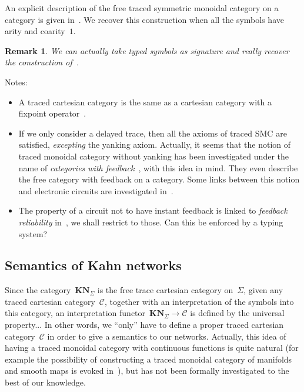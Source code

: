 \documentclass{article}
\newtheorem{remark}[theorem]{Remark}
\newcommand{\category}[1]{\mathbf{#1}}
\newcommand{\KN}{\category{KN}}
\renewcommand{\C}{\mathcal{C}}
\begin{document}
An explicit description of the free traced symmetric monoidal category on a
category is given in~\cite{abramsky:traced-compact-closed}. We recover this
construction when all the symbols have arity and coarity~$1$.

\begin{remark}
  We can actually take typed symbols as signature and really recover the
  construction of~\cite{abramsky:traced-compact-closed}.
\end{remark}

Notes:
\begin{itemize}
\item A traced cartesian category is the same as a cartesian category with a
  fixpoint operator~\cite{hasegawa1997recursion}.
\item If we only consider a delayed trace, then all the axioms of traced SMC are
  satisfied, \emph{excepting} the yanking axiom. Actually, it seems that the
  notion of traced monoidal category without yanking has been investigated under
  the name of \emph{categories with feedback}~\cite{katis2002feedback}, with
  this idea in mind. They even describe the free category with feedback on a
  category. Some links between this notion and electronic circuits are
  investigated in~\cite{katis1999algebra}.
\item The property of a circuit not to have instant feedback is linked to
  \emph{feedback reliability} in~\cite{pardo2004synchronous}, we shall restrict
  to those. Can this be enforced by a typing system?
\end{itemize}

\subsection{Semantics of Kahn networks}
Since the category~$\KN_\Sigma$ is the free trace cartesian category
on~$\Sigma$, given any traced cartesian category~$\C$, together with an
interpretation of the symbols into this category, an interpretation
functor~$\KN_\Sigma\to\C$ is defined by the universal property... In other
words, we ``only'' have to define a proper traced cartesian category~$\C$ in
order to give a semantics to our networks. Actually, this idea of having a
traced monoidal category with continuous functions is quite natural (for example
the possibility of constructing a traced monoidal category of manifolds and
smooth maps is evoked in~\cite{abramsky1996retracing}), but has not been
formally investigated to the best of our knowledge.
\end{document}

